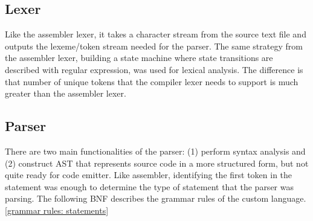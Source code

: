\documentclass[manuscript,screen,nonacm]{acmart}
\begin{document}
\subsection{Lexer}
Like the assembler lexer, it takes a character stream from the source text file and outputs the lexeme/token stream needed for the parser. The same strategy from the assembler lexer, building a state machine where state transitions are described with regular expression, was used for lexical analysis. The difference is that number of unique tokens that the compiler lexer needs to support is much greater than the assembler lexer.

\subsection{Parser}
There are two main functionalities of the parser: (1) perform syntax analysis and (2) construct AST that represents source code in a more structured form, but not quite ready for code emitter. Like assembler, identifying the first token in the statement was enough to determine the type of statement that the parser was parsing. The following BNF describes the grammar rules of the custom language. \autoref{grammar rules: statements}
\end{document}
